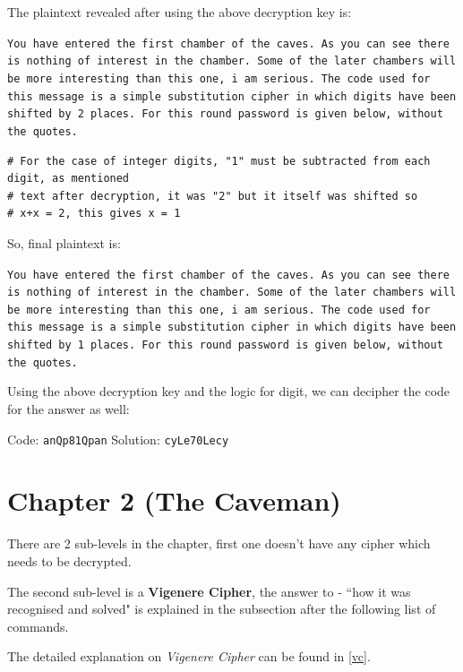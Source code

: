 \documentclass[10pt,twoside]{article}
\begin{document}
The plaintext revealed after using the above decryption key is: \newline

\texttt{You  have  entered  the  first  chamber  of  the  caves.  As  you  can  see  there  is  nothing  of  interest  in  the  chamber.  Some  of  the  later  chambers  will  be  more  interesting  than  this  one,  i  am  serious.  The  code  used  for  this  message  is  a  simple  substitution  cipher  in  which  digits  have  been  shifted  by  2  places.  For  this  round  password  is  given  below,  without  the  quotes.}

\begin{verbatim}
# For the case of integer digits, "1" must be subtracted from each digit, as mentioned
# text after decryption, it was "2" but it itself was shifted so
# x+x = 2, this gives x = 1
\end{verbatim}

So, final plaintext is: \newline

\texttt{You  have  entered  the  first  chamber  of  the  caves.  As  you  can  see  there  is  nothing  of  interest  in  the  chamber.  Some  of  the  later  chambers  will  be  more  interesting  than  this  one,  i  am  serious.  The  code  used  for  this  message  is  a  simple  substitution  cipher  in  which  digits  have  been  shifted  by  1  places.  For  this  round  password  is  given  below,  without  the  quotes.} \newline

Using the above decryption key and the logic for digit, we can decipher the code for the answer as well: \newline

Code: \texttt{anQp81Qpan} \newline
Solution: \texttt{cyLe70Lecy}
\newpage
\section{Chapter 2 (The Caveman)}
There are 2 sub-levels in the chapter, first one doesn't have any cipher which needs to be decrypted. \newline

The second sub-level is a \textbf{Vigenere Cipher}, the answer to - ``how it was recognised and solved" is explained in the subsection after the following list of commands. \newline

The detailed explanation on \textit{Vigenere Cipher} can be found in \cref{vc}. \newline
\end{document}
